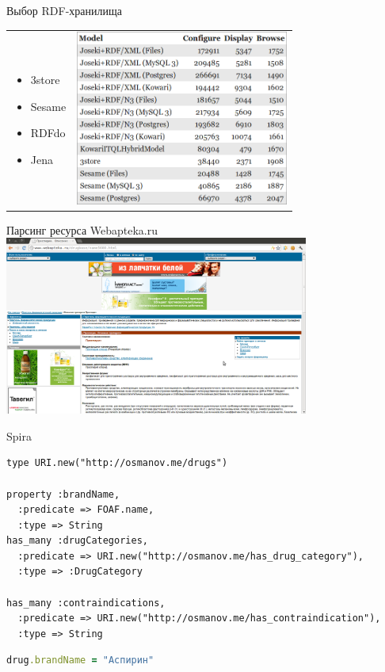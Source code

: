 \documentclass{beamer}
\begin{document}
\begin{frame}[t]{Выбор RDF-хранилища}
\begin{tabular}{l l}
\begin{minipage}{0.3\textwidth}
 \begin{itemize}
  \item 3store
  \item Sesame
  \item RDFdo
  \item Jena
 \end{itemize}
\end{minipage}
&
\begin{minipage}{0.7\textwidth}
\includegraphics[width=70mm]{storages.png}
\end{minipage}
\end{tabular}
\end{frame}
\begin{frame}[t]{Парсинг ресурса Webapteka.ru}
\includegraphics[width=100mm]{webapteka.png}
\end{frame}
\begin{frame}[fragile]{Spira}
\begin{lstlisting}
type URI.new("http://osmanov.me/drugs")

property :brandName,  
  :predicate => FOAF.name, 
  :type => String
has_many :drugCategories, 
  :predicate => URI.new("http://osmanov.me/has_drug_category"), 
  :type => :DrugCategory

has_many :contraindications, 
  :predicate => URI.new("http://osmanov.me/has_contraindication"), 
  :type => String
\end{lstlisting}
\begin{lstlisting}[language=Ruby]
drug.brandName = "Аспирин"
\end{lstlisting}
\end{frame}
\end{document}
